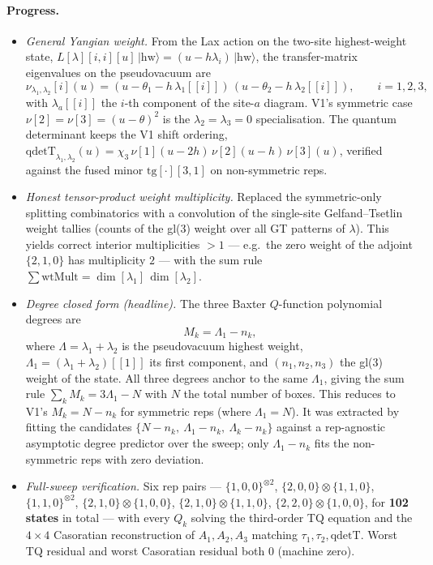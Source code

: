 \documentclass[12pt]{article}
\begin{document}
\paragraph{Progress.}
\begin{itemize}
  \item \emph{General Yangian weight.} From the Lax action on the
    two-site highest-weight state,
    $L[\lambda][i,i][u]\,|\mathrm{hw}\rangle=(u-h\lambda_i)\,|\mathrm{hw}\rangle$,
    the transfer-matrix eigenvalues on the pseudovacuum are
    \begin{equation}
      \nu_{\lambda_1,\lambda_2}[i](u)=
      (u-\theta_1-h\,\lambda_1[[i]])\,(u-\theta_2-h\,\lambda_2[[i]]),
      \qquad i=1,2,3,
    \end{equation}
    with $\lambda_a[[i]]$ the $i$-th component of the site-$a$ diagram.
    V1's symmetric case $\nu[2]=\nu[3]=(u-\theta)^2$ is the
    $\lambda_2=\lambda_3=0$ specialisation. The quantum determinant
    keeps the V1 shift ordering,
    $\mathrm{qdetT}_{\lambda_1,\lambda_2}(u)=\chi_3\,\nu[1](u-2h)\,\nu[2](u-h)\,\nu[3](u)$,
    verified against the fused minor $\mathrm{tg}[\cdot][3,1]$ on
    non-symmetric reps.
  \item \emph{Honest tensor-product weight multiplicity.} Replaced the
    symmetric-only splitting combinatorics with a convolution of the
    single-site Gelfand--Tsetlin weight tallies (counts of the gl(3)
    weight over all GT patterns of $\lambda$). This yields correct
    interior multiplicities $>1$ --- e.g.\ the zero weight of the adjoint
    $\{2,1,0\}$ has multiplicity $2$ --- with the sum rule
    $\sum \mathrm{wtMult}=\dim[\lambda_1]\,\dim[\lambda_2]$.
  \item \emph{Degree closed form (headline).} The three Baxter
    $Q$-function polynomial degrees are
    \begin{equation}
      M_k=\Lambda_1-n_k,
    \end{equation}
    where $\Lambda=\lambda_1+\lambda_2$ is the pseudovacuum highest
    weight, $\Lambda_1=(\lambda_1+\lambda_2)[[1]]$ its first component,
    and $(n_1,n_2,n_3)$ the gl(3) weight of the state. All three degrees
    anchor to the same $\Lambda_1$, giving the sum rule
    $\sum_k M_k=3\Lambda_1-N$ with $N$ the total number of boxes. This
    reduces to V1's $M_k=N-n_k$ for symmetric reps (where $\Lambda_1=N$).
    It was extracted by fitting the candidates
    $\{N-n_k,\ \Lambda_1-n_k,\ \Lambda_k-n_k\}$ against a rep-agnostic
    asymptotic degree predictor over the sweep; only $\Lambda_1-n_k$ fits
    the non-symmetric reps with zero deviation.
  \item \emph{Full-sweep verification.} Six rep pairs ---
    $\{1,0,0\}^{\otimes2}$, $\{2,0,0\}\otimes\{1,1,0\}$,
    $\{1,1,0\}^{\otimes2}$, $\{2,1,0\}\otimes\{1,0,0\}$,
    $\{2,1,0\}\otimes\{1,1,0\}$, $\{2,2,0\}\otimes\{1,0,0\}$, for
    \textbf{102 states} in total --- with every $Q_k$ solving the
    third-order TQ equation and the $4\times4$ Casoratian reconstruction
    of $A_1,A_2,A_3$ matching $\tau_1,\tau_2,\mathrm{qdetT}$. Worst TQ residual
    and worst Casoratian residual both $0$ (machine zero).
\end{itemize}
\end{document}
